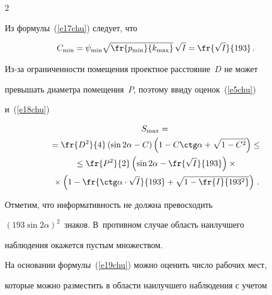 \begin{multicols}{2}
\begin{equation}
\label{e17chu}


\end{equation}


Из формулы~(\ref{e17chu}) следует, что


\begin{equation}


C_{\min} 


=\psi_{\min}\sqrt{\fr{p_{\min}}{k_{\max}}}\,\sqrt{I}=\fr{\sqrt{I}}{193}\,.


\label{e18chu}


\end{equation}


     


     Из-за ограниченности помещения проектное расстояние~$D$ не может 


превышать диаметра помещения~$P$, поэтому ввиду оценок~(\ref{e5chu}) 


и~(\ref{e18chu})


     \begin{multline}


     S_{\max} ={}\\


     {}=\fr{D^2}{4}\left(\sin2\alpha-C\right)\left(1-C\ctg\alpha+\sqrt{1-


C^2}\right)\leq{}\\


     {}\leq \fr{P^2}{2}\left(\sin2\alpha-\fr{\sqrt{I}}{193}\right)\times{}\\


     {}\times\left(1-


\fr{\ctg \alpha\cdot \sqrt{I}}{193}+\sqrt{1-\fr{I}{193^2}}\right)\,.


     \label{e19chu}


     \end{multline}


     


     Отметим, что информативность не должна превосходить 


$(193\sin2\alpha)^2$~знаков. В~противном случае область наилучшего 


наблюдения окажется пустым множеством.





На основании формулы~(\ref{e19chu}) можно оценить число рабочих мест, 


которые можно разместить в области наилучшего наблюдения с учетом 



\end{multicols}
